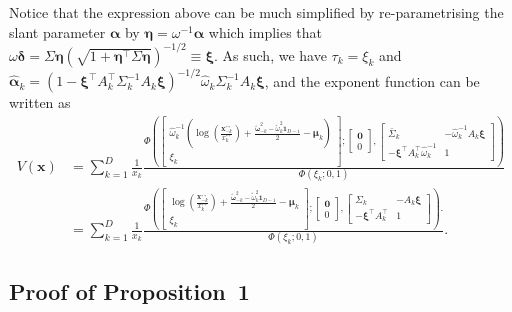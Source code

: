 \documentclass[12pt]{article}
\begin{document}
Notice that the expression above can be much simplified by re-parametrising the slant parameter $\bm \alpha$ by $\bm \eta = \omega^{-1}\bm\alpha$ which implies that $\omega \bm \delta = \Sigma\bm\eta\left(\sqrt{1+\bm\eta^\top\Sigma\bm\eta}\right)^{-1/2} \equiv \bm\xi$. As such, we have $\tau_k = \xi_k$ and $\hat{\bm\alpha}_k = \left(1-\bm\xi^\top A_k^\top\Sigma_k^{-1} A_k \bm\xi \right)^{-1/2} \hat{ \omega}_k\Sigma_k^{-1}A_k \bm\xi$, and the exponent function can be written as
%
\begin{align*}
V(\bm x) &= \sum_{k=1}^D \frac{1}{x_k} 
\frac{\Phi \left(
    \begin{bmatrix} 
        \hat{\omega}_k^{-1}\left( \log \left( \frac{\bm x^{\circ\circ}_{-k}}{x^{\circ\circ}_k} \right) + \frac{\tilde{\bm \omega}_{-k}^2 - \tilde{\omega}_k^2\bm 1_{D-1}}{2} - \bm \mu_k\right)  \\
        \xi_k
    \end{bmatrix};
    \begin{bmatrix} 
    \bm 0 \\ 0
    \end{bmatrix},
    \begin{bmatrix}
        \bar\Sigma_k & - \hat{\omega}_k^{-1} A_k \bm \xi  \\
       - \bm \xi^\top A_k^\top \hat{\omega}_k^{-1} &	1
    \end{bmatrix} \right)
    }
    {\Phi\left(\xi_k; 0, 1\right)} \\
 &= \sum_{k=1}^D \frac{1}{x_k} 
\frac{\Phi \left(
    \begin{bmatrix} 
        \log \left( \frac{\bm x^{\circ\circ}_{-k}}{x^{\circ\circ}_k} \right) + \frac{\tilde{\bm \omega}_{-k}^2 - \tilde{\omega}_k^2\bm 1_{D-1}}{2} - \bm \mu_k  \\
        \xi_k
    \end{bmatrix};
    \begin{bmatrix} 
    \bm 0 \\ 0
    \end{bmatrix},
    \begin{bmatrix}
        \Sigma_k & - A_k \bm \xi  \\
       - \bm \xi^\top A_k^\top &	1
    \end{bmatrix} \right).
    }
    {\Phi\left(\xi_k; 0, 1\right)}.  
\end{align*}
%

\subsection{Proof of Proposition~1}
\end{document}
